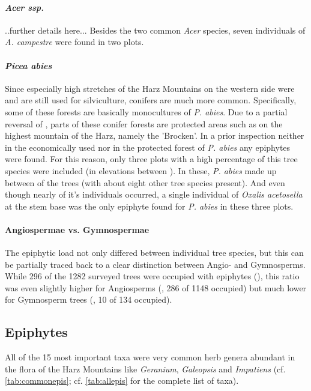 \documentclass[12pt, a4paper,oneside]{article}
\begin{document}
%

\paragraph[Acer ssp.]{\textit{Acer ssp.}}
..further details here... Besides the two common \textit{Acer} species, seven individuals of \textit{A. campestre} were found in two plots.

\paragraph[Picea abies]{\textit{Picea abies}} Since especially high stretches of the Harz Mountains on the western side were and are still used for silviculture, conifers are much more common. Specifically, some of these forests are basically monocultures of \textit{P. abies}. Due to a partial reversal of , parts of these conifer forests are protected areas such as on the highest mountain of the Harz, namely the 'Brocken'. In a prior inspection neither in the economically used nor in the protected forest of \textit{P. abies} any epiphytes were found. For this reason, only three plots with a high percentage of this tree species were included (in elevations between ). In these, \textit{P. abies} made up between  of the trees (with about eight other tree species present). And even though nearly  of it's individuals occurred, a single individual of \textit{Oxalis acetosella} at the stem base was the only epiphyte found for \textit{P. abies} in these three plots. 

\paragraph{Angiospermae vs. Gymnospermae}
The epiphytic load not only differed between individual tree species, but this can be partially traced back to a clear distinction between Angio- and Gymnosperms. While 296 of the 1282 surveyed trees were occupied with epiphytes (), this ratio was even slightly higher for Angiosperms (, 286 of 1148 occupied) but much lower for Gymnosperm trees (, 10 of 134 occupied). 



	
\subsection{Epiphytes}
All of the 15 most important taxa were very common herb genera abundant in the flora of the Harz Mountains like \textit{Geranium}, \textit{Galeopsis} and \textit{Impatiens} (cf. \autoref{tab:commonepis}; cf. \autoref{tab:allepis} for the complete list of taxa). 
\end{document}
